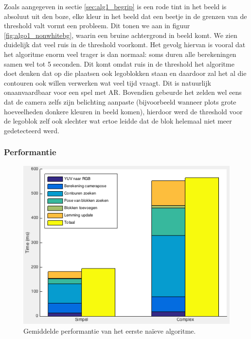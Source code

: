 Zoals aangegeven in sectie \ref{sec:alg1_begrip} is een rode tint in het beeld is absoluut uit den boze, elke kleur in het beeld dat een beetje in de grenzen van de threshold valt vormt een probleem. Dit tonen we aan in figuur \ref{fig:algo1_nonwhitebg}, waarin een bruine achtergrond in beeld komt. We zien duidelijk dat veel ruis in de threshold voorkomt. Het gevolg hiervan is vooral dat het algoritme enorm veel trager is dan normaal: soms duren alle berekeningen samen wel tot 5 seconden. Dit komt omdat ruis in de threshold het algoritme doet denken dat op die plaatsen ook legoblokken staan en daardoor zal het al die contouren ook willen verwerken wat veel tijd vraagt. Dit is natuurlijk onaanvaardbaar voor een spel met AR. Bovendien gebeurde het zelden wel eens dat de camera zelfs zijn belichting aanpaste (bijvoorbeeld wanneer plots grote hoeveelheden donkere kleuren in beeld komen), hierdoor werd de threshold voor de legoblok zelf ook slechter wat ertoe leidde dat de blok helemaal niet meer gedetecteerd werd.

\subsubsection*{Performantie}

\begin{figure}
  \centering
  \includegraphics[width=.75\linewidth]{img/alg1Perf}
  \caption{Gemiddelde performantie van het eerste na\"ieve algoritme.}
  \label{fig:perf_algo1}
\end{figure}


